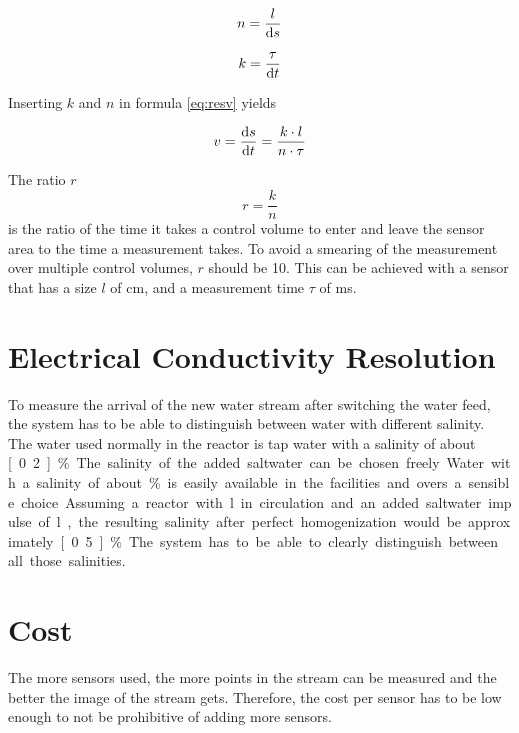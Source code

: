 \begin{equation}
	n = \dfrac{l}{\mathop{}\!\mathrm{d} s}
\label{eq:resn} 
\end{equation}

\begin{equation}
	k = \dfrac{ \tau}{\mathop{}\!\mathrm{d} t}
\label{eq:resk}
\end{equation}

Inserting $ k $ and $ n $ in formula \eqref{eq:resv} yields

\begin{equation}
	v = \dfrac{\mathop{}\!\mathrm{d} s}{\mathop{}\!\mathrm{d} t} = \dfrac{k \cdot l}{n \cdot \tau}
\label{eq:resv1} 
\end{equation}

The ratio $ r $
\begin{equation}
	r = \frac{k}{n}
\label{eq:resr} 
\end{equation}
is the ratio of the time it takes a control volume to enter and leave the sensor area  to the time a measurement takes. To avoid a smearing of the measurement over multiple control volumes, $ r $ should be 10. This can be achieved with a sensor that has a size $ l $ of \unit[1]{cm}, and a measurement time $ \tau $ of \unit[1]{ms}.

\section{Electrical Conductivity Resolution}

To measure the arrival of the new water stream after switching the water feed, the system has to be able to distinguish between water with different salinity. The water used normally in the reactor is tap water with a salinity of about \unit[0.2]{\%}. The salinity of the added saltwater can be chosen freely. Water with a salinity of about \unit[5]{\%} is easily available in the facilities and overs a sensible choice. Assuming a reactor with \unit[65]{l} in circulation and an added saltwater impulse of \unit[5]{l}, the resulting salinity after perfect homogenization would be approximately \unit[0.5]{\%}. The system has to be able to clearly distinguish between all those salinities.

\section{Cost}

The more sensors used, the more points in the stream can be measured and the better the image of the stream gets. Therefore, the cost per sensor has to be low enough to not be prohibitive of adding more sensors.

